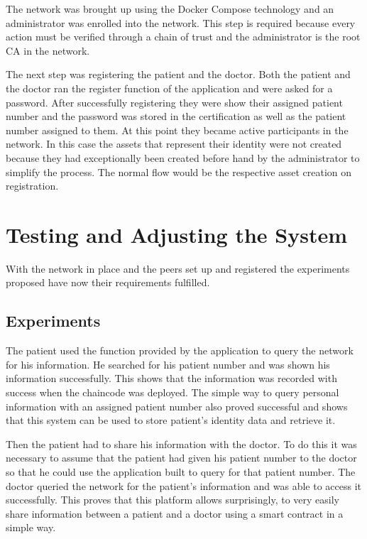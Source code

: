 The network was brought up using the Docker Compose technology and an
administrator was enrolled into the network. This step is required because
every action must be verified through a chain of trust and the administrator is
the root CA in the network.

The next step was registering the patient and the doctor. Both the patient and
the doctor ran the register function of the application and were asked for a
password. After successfully registering they were show their assigned patient
number and the password was stored in the certification as well as the patient
number assigned to them. At this point they became active participants in the
network. In this case the assets that represent their identity were not created
because they had exceptionally been created before hand by the administrator to
simplify the process. The normal flow would be the respective asset creation on
registration.

\section{Testing and Adjusting the System}

With the network in place and the peers set up and registered the experiments
proposed have now their requirements fulfilled.

\subsection{Experiments}

The patient used the function provided by the application to query the network
for his information. He searched for his patient number and was shown his
information successfully. This shows that the information was recorded with
success when the chaincode was deployed. The simple way to query personal
information with an assigned patient number also proved successful and shows
that this system can be used to store patient's identity data and retrieve it.

Then the patient had to share his information with the doctor. To do this it
was necessary to assume that the patient had given his patient number to the
doctor so that he could use the application built to query for that patient
number. The doctor queried the network for the patient's information and was
able to access it successfully. This proves that this platform allows
surprisingly, to very easily share information between a patient and a doctor
using a smart contract in a simple way.


